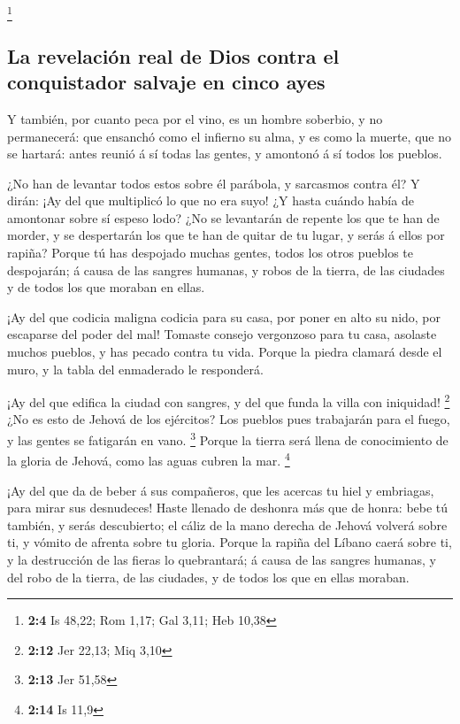 \footnote{\textbf{2:4} Is 48,22; Rom 1,17; Gal 3,11; Heb 10,38}

\hypertarget{la-revelaciuxf3n-real-de-dios-contra-el-conquistador-salvaje-en-cinco-ayes}{%
\subsection{La revelación real de Dios contra el conquistador salvaje en
cinco
ayes}\label{la-revelaciuxf3n-real-de-dios-contra-el-conquistador-salvaje-en-cinco-ayes}}

 Y también, por cuanto peca por el vino, es un hombre
soberbio, y no permanecerá: que ensanchó como el infierno su alma, y es
como la muerte, que no se hartará: antes reunió á sí todas las gentes, y
amontonó á sí todos los pueblos.

 ¿No han de levantar todos estos sobre él parábola, y
sarcasmos contra él? Y dirán: ¡Ay del que multiplicó lo que no era suyo!
¿Y hasta cuándo había de amontonar sobre sí espeso lodo? 
¿No se levantarán de repente los que te han de morder, y se despertarán
los que te han de quitar de tu lugar, y serás á ellos por rapiña?
 Porque tú has despojado muchas gentes, todos los otros
pueblos te despojarán; á causa de las sangres humanas, y robos de la
tierra, de las ciudades y de todos los que moraban en ellas.

 ¡Ay del que codicia maligna codicia para su casa, por
poner en alto su nido, por escaparse del poder del mal! 
Tomaste consejo vergonzoso para tu casa, asolaste muchos pueblos, y has
pecado contra tu vida.  Porque la piedra clamará desde el
muro, y la tabla del enmaderado le responderá.

 ¡Ay del que edifica la ciudad con sangres, y del que
funda la villa con iniquidad! \footnote{\textbf{2:12} Jer 22,13; Miq
  3,10}  ¿No es esto de Jehová de los ejércitos? Los
pueblos pues trabajarán para el fuego, y las gentes se fatigarán en
vano. \footnote{\textbf{2:13} Jer 51,58}  Porque la
tierra será llena de conocimiento de la gloria de Jehová, como las aguas
cubren la mar. \footnote{\textbf{2:14} Is 11,9}

 ¡Ay del que da de beber á sus compañeros, que les
acercas tu hiel y embriagas, para mirar sus desnudeces! 
Haste llenado de deshonra más que de honra: bebe tú también, y serás
descubierto; el cáliz de la mano derecha de Jehová volverá sobre ti, y
vómito de afrenta sobre tu gloria.  Porque la rapiña del
Líbano caerá sobre ti, y la destrucción de las fieras lo quebrantará; á
causa de las sangres humanas, y del robo de la tierra, de las ciudades,
y de todos los que en ellas moraban.

